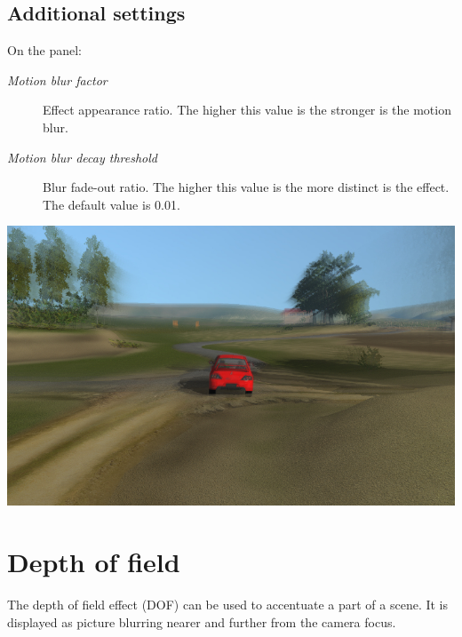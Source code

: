 \documentclass[a4paper,12pt,oneside]{sphinxmanual}
\begin{document}
\subsection{Additional settings}
\label{postprocessing_effects:id4}
On the  panel:
\begin{description}
\item[{\emph{Motion blur factor}}] \leavevmode
Effect appearance ratio. The higher this value is the stronger is the motion blur.

\item[{\emph{Motion blur decay threshold}}] \leavevmode
Blur fade-out ratio. The higher this value is the more distinct is the effect. The default value is 0.01.

\end{description}

{\hfill\includegraphics[width=1.000\linewidth]{motion_blur.jpg}\hfill}

\begin{DUlineblock}{0em}
\item[] 
\end{DUlineblock}


\section{Depth of field}
\label{postprocessing_effects:id5}\label{postprocessing_effects:dof}\label{postprocessing_effects:index-1}
The depth of field effect (DOF) can be used to accentuate a part of a scene. It is displayed as picture blurring nearer and further from the camera focus.
\end{document}

